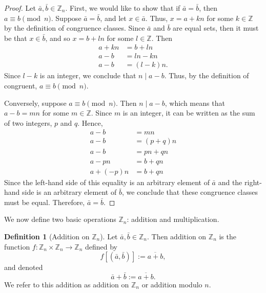 \documentclass[12pt, titlepage]{amsart}
\newcommand\Z{{\mathbb Z}}
\theoremstyle{definition}
\newtheorem{definition}{Definition}[subsection]
\begin{document}
	\begin{proof}
		Let $\bar{a}, \bar{b} \in \Z_n$. First, we would like to show that if $\bar{a} = \bar{b}$, then $a \equiv b \pmod n$.
		Suppose $\bar{a} = \bar{b}$, and let $x \in \bar{a}$.
		Thus, $x = a + kn$ for some $k \in \Z$ by the definition of congruence classes.
		Since $\bar{a}$ and $\bar{b}$ are equal sets, then it must be that $x \in \bar{b}$, and so $x = b + ln$ for some $l \in \Z$.
		Then
		\begin{align*}
			a+kn &= b+ln \\
			a-b &= ln-kn \\
			a-b &= (l-k)n.
		\end{align*}
		Since $l-k$ is an integer, we conclude that $n \mid a-b$.
		Thus, by the definition of congruent, $a \equiv b \pmod n$.
		
		Conversely, suppose $a \equiv b \pmod n$.
		Then $n \mid a - b$, which means that $a-b = mn$ for some $m\in \Z$.
		Since $m$ is an integer, it can be written as the sum of two integers, $p$ and $q$.
		Hence,
		\begin{align*}
			a-b &= mn \\
			a-b &= (p+q)n \\
			a-b &= pn+qn \\
			a-pn &= b + qn \\
			a + (-p)n &= b + qn
		\end{align*}
		Since the left-hand side of this equality is an arbitrary element of $\bar{a}$ and the right-hand side is an arbitrary element of $\bar{b}$, we conclude that these congruence classes must be equal.
		Therefore, $\bar{a} = \bar{b}$.
	\end{proof}
	
	
	We now define two basic operations $\Z_n$: addition and multiplication.
	

	\begin{definition}[Addition on $\Z_n$]\label{definition:addition on Zn}
		Let $\bar{a}, \bar{b} \in \Z_n$.
		Then addition on $\Z_n$ is the function $f: \Z_n \times \Z_n \to \Z_n$ defined by $$f[(\bar{a}, \bar{b})] := \overline{a + b},$$
		and denoted $$ \bar{a} + \bar{b} := \overline{a + b}.$$
		We refer to this addition as addition on $\Z_n$ or addition modulo $n$.
	\end{definition}
	
\end{document}
